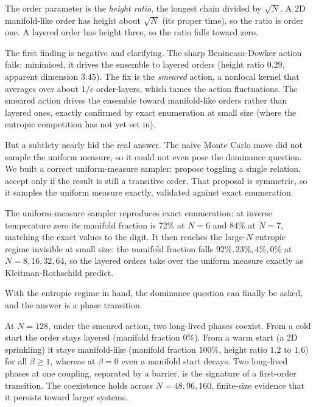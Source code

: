 The order parameter is the \emph{height ratio}, the longest chain divided by $\sqrt{N}$. A 2D manifold-like order has height about $\sqrt{N}$ (its proper time), so the ratio is order one. A layered order has height three, so the ratio falls toward zero.

The first finding is negative and clarifying. The sharp Benincasa-Dowker action fails: minimised, it drives the ensemble to layered orders (height ratio $0.29$, apparent dimension $3.45$). The fix is the \emph{smeared} action, a nonlocal kernel that averages over about $1/\epsilon$ order-layers, which tames the action fluctuations. The smeared action drives the ensemble toward manifold-like orders rather than layered ones, exactly confirmed by exact enumeration at small size (where the entropic competition has not yet set in).

But a subtlety nearly hid the real answer. The naive Monte Carlo move did not sample the uniform measure, so it could not even pose the dominance question. We built a correct uniform-measure sampler: propose toggling a single relation, accept only if the result is still a transitive order. That proposal is symmetric, so it samples the uniform measure exactly, validated against exact enumeration.

\begin{result}
The uniform-measure sampler reproduces exact enumeration: at inverse temperature zero its manifold fraction is $72\%$ at $N=6$ and $84\%$ at $N=7$, matching the exact values to the digit. It then reaches the large-$N$ entropic regime invisible at small size: the manifold fraction falls $92\%, 23\%, 4\%, 0\%$ at $N = 8, 16, 32, 64$, so the layered orders take over the uniform measure exactly as Kleitman-Rothschild predict.
\end{result}

With the entropic regime in hand, the dominance question can finally be asked, and the answer is a phase transition.

\begin{result}
At $N=128$, under the smeared action, two long-lived phases coexist. From a cold start the order stays layered (manifold fraction $0\%$). From a warm start (a 2D sprinkling) it stays manifold-like (manifold fraction $100\%$, height ratio $1.2$ to $1.6$) for all $\beta \ge 1$, whereas at $\beta = 0$ even a manifold start decays. Two long-lived phases at one coupling, separated by a barrier, is the signature of a first-order transition. The coexistence holds across $N = 48, 96, 160$, finite-size evidence that it persists toward larger systems.
\end{result}

